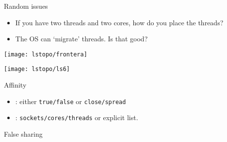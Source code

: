 
\begin{numberedframe}{Random issues}
  \begin{itemize}
  \item If you have two threads and two cores, how do you place the threads?
  \item The OS can `migrate' threads. Is that good?
  \end{itemize}
\end{numberedframe}

\begin{numberedframe}{}
\texttt{[image: lstopo/frontera]}
\end{numberedframe}

\begin{numberedframe}{}
\texttt{[image: lstopo/ls6]}
\end{numberedframe}

\begin{numberedframe}{Affinity}
  \begin{itemize}
  \item
    : either \lstinline{true/false} or \lstinline{close/spread}
  \item 
    : \lstinline{sockets/cores/threads} or explicit list.
  \end{itemize}
\end{numberedframe}



\begin{numberedframe}{False sharing}
  
\end{numberedframe}

\endinput

\begin{numberedframe}{}
  \begin{itemize}
  \item 
  \end{itemize}
\end{numberedframe}

